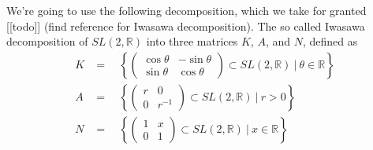 \documentclass[
]{article}
\begin{document}
We're going to use the following decomposition, which we take for
granted {[}{[}todo{]}{]} (find reference for Iwasawa decomposition). The
so called Iwasawa decomposition of \(SL(2, \mathbb{R})\) into three
matrices \(K\), \(A\), and \(N\), defined as \[
\begin{align}
K & =\quad \left\{ \begin{pmatrix} \cos\theta & -\sin\theta \\ \sin\theta & \cos\theta\end{pmatrix} \subset SL(2, \mathbb{R})  \ | \ \theta \in \mathbb{R} \right\} \\
A & =\quad \left\{ \begin{pmatrix} r & 0 \\ 0 & r^{-1} \end{pmatrix} \subset SL(2, \mathbb{R})  \ | \ r > 0 \right\} \\
N & =\quad \left\{ \begin{pmatrix} 1 & x \\ 0 & 1 \end{pmatrix} \subset SL(2, \mathbb{R})  \ | \ x \in \mathbb{R} \right\}\\
\end{align}
\]
\end{document}
